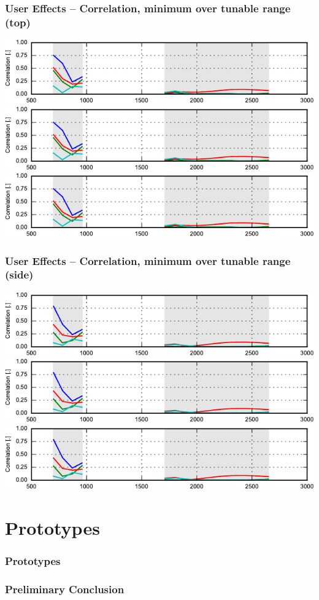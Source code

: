 \begin{frame}
    \frametitle{User Effects -- Correlation, minimum over tunable range (top)}
    \begin{center}
        \includegraphics{img/soren/ue/design2sn/corrtop.pdf}\\
        \includegraphics{img/soren/ue/design2sn/corrtop.pdf}\\
        \includegraphics{img/soren/ue/design2sn/corrtop.pdf}
    \end{center}
    \legendfooter
\end{frame}

\begin{frame}
    \frametitle{User Effects -- Correlation, minimum over tunable range (side)}
    \begin{center}
        \includegraphics{img/soren/ue/design2sn/corrside.pdf}\\
        \includegraphics{img/soren/ue/design2sn/corrside.pdf}\\
        \includegraphics{img/soren/ue/design2sn/corrside.pdf}
    \end{center}
    \legendfooter
\end{frame}

\section{Prototypes}
\begin{frame}
    \frametitle{Prototypes}
\end{frame}

\begin{frame}
    \frametitle{Preliminary Conclusion}
\end{frame}
